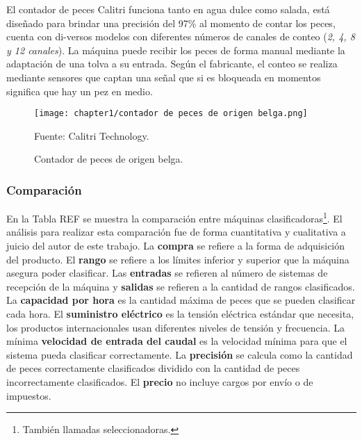 El contador de peces Calitri funciona tanto en agua dulce como salada, está diseñado para brindar una precisión del 97\% al momento de contar los peces, cuenta con di-versos modelos con diferentes números de canales de conteo (\textit{2, 4, 8 y 12 canales}). La máquina puede recibir los peces de forma manual mediante la adaptación de una tolva a su entrada.\cite{Calitri2018} Según el fabricante, el conteo se realiza mediante sensores que captan una señal que si es bloqueada en momentos significa que hay un pez en medio.

\begin{figure}[H]
	\centering
	\texttt{[image: chapter1/contador de peces de origen belga.png]}
	\caption{Contador de peces de origen belga.}
	Fuente: Calitri Technology.
	\label{fig:contador de peces de origen belga}
\end{figure}

\subsubsection{Comparación}

En la Tabla REF se muestra la comparación entre máquinas clasificadoras\footnote{También llamadas seleccionadoras.}. El análisis para realizar esta comparación fue de forma cuantitativa y cualitativa a juicio del autor de este trabajo. La \textbf{compra} se refiere a la forma de adquisición del producto. El \textbf{rango} se refiere a los límites inferior y superior que la máquina asegura poder clasificar. Las \textbf{entradas} se refieren al número de sistemas de recepción de la máquina y \textbf{salidas} se refieren a la cantidad de rangos clasificados. La \textbf{capacidad por hora} es la cantidad máxima de peces que se pueden clasificar cada hora. El \textbf{suministro eléctrico} es la tensión eléctrica estándar que necesita, los productos internacionales usan diferentes niveles de tensión y frecuencia.  La mínima \textbf{velocidad de entrada del caudal} es la velocidad mínima para que el sistema pueda clasificar correctamente. La \textbf{precisión} se calcula como la cantidad de peces correctamente clasificados dividido con la cantidad de peces incorrectamente clasificados. El \textbf{precio} no incluye cargos por envío o de impuestos.

